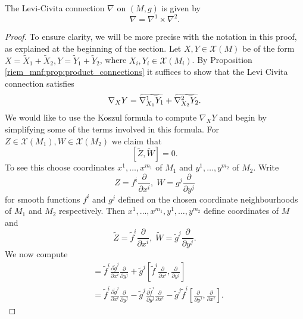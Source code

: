 
\begin{proposition}
    \label{riem_mnf:prop:levi_civita}
    The Levi-Civita connection $\nabla$ on $(M,g)$ is given by
    \[
    \nabla = \nabla^1 \times \nabla^2.
    \]
\end{proposition}

\begin{proof}
    To ensure clarity, we will be more precise with the notation in this proof, as explained at the beginning of the section. Let $X,Y \in \mathscr{X}(M)$ be of the form $X=\tilde{X}_1+\tilde{X}_2, Y=\tilde{Y}_1+\tilde{Y}_2$, where $X_i,Y_i \in \mathscr{X}(M_i)$. By Proposition \ref{riem_mnf:prop:product_connections} it suffices to show that the Levi Civita connection satisfies
    \[
    \nabla_XY = \reallywidetilde{\nabla^1_{X_1}Y_1}{5} + \reallywidetilde{\nabla^2_{X_2}Y_2}{5}.
    \]
    We would like to use the Koszul formula to compute $\nabla_XY$ and begin by simplifying some of the terms involved in this formula. For $Z \in \mathscr{X}(M_1), W \in \mathscr{X}(M_2)$ we claim that 
    \[
    [\tilde{Z},\tilde{W}] = 0.
    \] 
    To see this choose coordinates $x^1,\ldots,x^{m_1}$ of $M_1$ and $y^1,\ldots,y^{m_2}$ of $M_2$. Write 
    \[
    Z= f^i \frac{\partial}{\partial x^i}, \; W= g^j \frac{\partial}{\partial y^j}
    \] 
    for smooth functions $f^i$ and $g^j$ defined on the chosen coordinate neighbourhoods of $M_1$ and $M_2$ respectively. Then $x^1,\ldots,x^{m_1},y^1,\ldots,y^{m_2}$ define coordinates of $M$ and 
    \[
    \tilde{Z}= \tilde{f}^i \frac{\partial}{\partial x^i}, \; \tilde{W}= \tilde{g}^j \frac{\partial}{\partial y^j}.
    \]
    We now compute 
    \begin{align*}
        [\tilde{Z},\tilde{W}] &= \tilde{f}^i\frac{\partial \tilde{g}^j}{\partial x^i}\frac{\partial}{\partial y^j} + \tilde{g}^j\left[\tilde{f}^i \frac{\partial}{\partial x^i},\frac{\partial}{\partial y^j}\right] \\
        &= \tilde{f}^i\frac{\partial \tilde{g}^j}{\partial x^i}\frac{\partial}{\partial y^j} - \tilde{g}^j\frac{\partial \tilde{f}^i}{\partial y^j}\frac{\partial}{\partial x^i} - \tilde{g}^j\tilde{f}^i \left[ \frac{\partial}{\partial y^j},\frac{\partial}{\partial x^i} \right].

\end{align*}
\end{proof}
